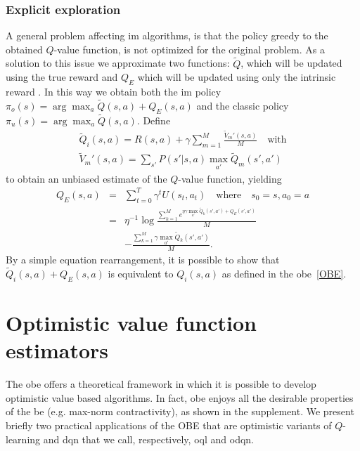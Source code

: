 \subsubsection{Explicit exploration} A general problem affecting \gls{im} algorithms, is that the policy greedy to the obtained $Q$-value function, is not optimized for the original problem. As a solution to this issue we approximate two functions: $\tilde{Q}$, which will be updated using the true reward and $Q_E$ which will be updated using only the intrinsic reward \cite{szita2008many}. In this way we obtain both the \gls{im} policy $\pi_o(s) = \arg \max_{a} \tilde{Q}(s,a) + Q_E(s,a)$ and the classic policy  $\pi_u(s) = \arg \max_{a} \tilde{Q}(s,a)$.
Define 
\begin{eqnarray}
	\tilde{Q}_i(s,a) = R(s,a) + \gamma \sum_{m=1}^M\frac{\tilde{V}_m'(s,a)}{M} \quad \text{with} \\
	\tilde{V}_m'(s,a) =  \sum_{s'} P(s'|s,a)\max_{a'}\tilde{Q}_m(s',a')
\end{eqnarray}
to obtain an unbiased estimate of the $Q$-value function, yielding
\begin{eqnarray}
Q_E(s,a) & = & \sum_{t=0}^T \gamma^t U(s_t,a_t) \quad \text{where} \quad s_0 = s, a_0 = a \nonumber \\
& = & \eta^{-1}\log \frac{\sum_{k=1}^M e^{\eta\gamma\max_{a'}\tilde{Q}_k(s',a') + Q_E(s',a')}}{M}\nonumber \\
& &  -  \frac{\sum_{k=1}^M \gamma\max_{a'}\tilde{Q}_k(s',a')}{M}.
\end{eqnarray}
By a simple equation rearrangement, it is possible to show that $\tilde{Q}_i(s,a) + Q_E(s,a)$ is equivalent to $Q_i(s,a)$ as defined in the \gls{obe}~\ref{OBE}.
 
\section{Optimistic value function estimators}
The \gls{obe} offers a theoretical framework in which it is possible to develop optimistic value based algorithms. In fact, \gls{obe} enjoys all the desirable properties of the \gls{be} (e.g. max-norm contractivity), as shown in the supplement. We present briefly two practical applications of the OBE that are optimistic variants of $Q$-learning and \gls{dqn} that we call, respectively, \gls{oql} and \gls{odqn}.
